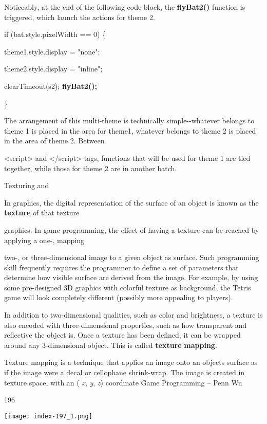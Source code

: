\documentclass[
]{article}
\begin{document}
Noticeably, at the end of the following code block, the
\textbf{flyBat2()} function is triggered, which launch the actions for
theme 2.

if (bat.style.pixelWidth == 0) \{

theme1.style.display = "none";

theme2.style.display = "inline";

clearTimeout(s2); \textbf{flyBat2();}

\}

The arrangement of this multi-theme is technically simple-\/-whatever
belongs to theme 1 is placed in the area for theme1, whatever belongs to
theme 2 is placed in the area of theme 2. Between

\textless script\textgreater{} and \textless/script\textgreater{} tags,
functions that will be used for theme 1 are tied together, while those
for theme 2 are in another batch.

Texturing and

In graphics, the digital representation of the surface of an object is
known as the \textbf{texture} of that texture

graphics. In game programming, the effect of having a texture can be
reached by applying a one-, mapping

two-, or three-dimensional image to a given object as surface. Such
programming skill frequently requires the programmer to define a set of
parameters that determine how visible surface are derived from the
image. For example, by using some pre-designed 3D graphics with colorful
texture as background, the Tetris game will look completely different
(possibly more appealing to players).

In addition to two-dimensional qualities, such as color and brightness,
a texture is also encoded with three-dimensional properties, such as how
transparent and reflective the object is. Once a texture has been
defined, it can be wrapped around any 3-dimensional object. This is
called \textbf{texture} \textbf{mapping}.

Texture mapping is a technique that applies an image onto an
object\textquotesingle s surface as if the image were a decal or
cellophane shrink-wrap. The image is created in texture space, with an (
\emph{x}, \emph{y}, \emph{z}) coordinate Game Programming -- Penn Wu

196

\protect\hypertarget{index_split_011.htmlux5cux23p197}{}{}\texttt{[image: index-197\_1.png]}
\end{document}
